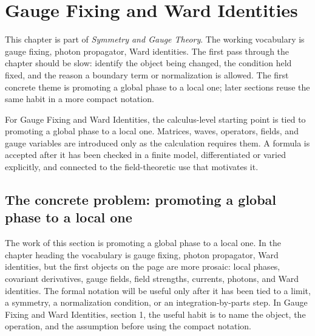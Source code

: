 \chapter{Gauge Fixing and Ward Identities}


This chapter is part of \emph{Symmetry and Gauge Theory}.  The working vocabulary is gauge fixing, photon propagator, Ward identities.  The first pass through the chapter should be slow: identify the object being changed, the condition held fixed, and the reason a boundary term or normalization is allowed.  The first concrete theme is promoting a global phase to a local one; later sections reuse the same habit in a more compact notation.

For Gauge Fixing and Ward Identities, the calculus-level starting point is tied to promoting a global phase to a local one.  Matrices, waves, operators, fields, and gauge variables are introduced only as the calculation requires them.  A formula is accepted after it has been checked in a finite model, differentiated or varied explicitly, and connected to the field-theoretic use that motivates it.

\section{The concrete problem: promoting a global phase to a local one}













The work of this section is promoting a global phase to a local one.  In the chapter heading the vocabulary is gauge fixing, photon propagator, Ward identities, but the first objects on the page are more prosaic: local phases, covariant derivatives, gauge fields, field strengths, currents, photons, and Ward identities.  The formal notation will be useful only after it has been tied to a limit, a symmetry, a normalization condition, or an integration-by-parts step.  In Gauge Fixing and Ward Identities, section 1, the useful habit is to name the object, the operation, and the assumption before using the compact notation.

